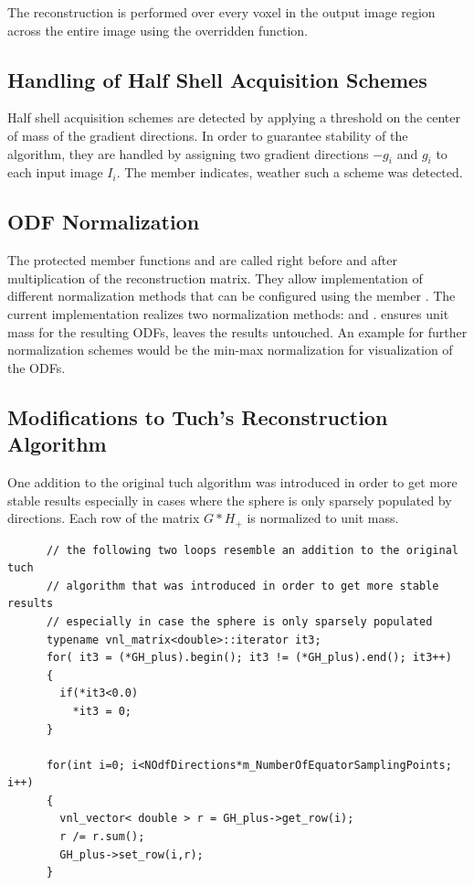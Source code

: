 \documentclass{InsightArticle}
\begin{document}
The reconstruction is performed over every voxel in the output image region across the entire image using the overridden  function.

\subsection{Handling of Half Shell Acquisition Schemes}
Half shell acquisition schemes are detected by applying a threshold on the center of mass of the gradient directions. In order to guarantee stability of the algorithm, they are handled by assigning two gradient directions $-g_i$ and $g_i$ to each input image $I_i$. The member  indicates, weather such a scheme was detected.

\subsection{ODF Normalization}
The protected member functions  and  are called right before and after multiplication of the reconstruction matrix. They allow implementation of different normalization methods that can be configured using the member . The current implementation realizes two normalization methods:  and .  ensures unit mass for the resulting ODFs,  leaves the results untouched. An example for further normalization schemes would be the min-max normalization for visualization of the ODFs.

\subsection{Modifications to Tuch's Reconstruction Algorithm}
One addition to the original tuch algorithm was introduced in order to get more stable results especially in cases where the sphere is only sparsely populated by directions. Each row of the matrix $G*H_+$ is normalized to unit mass. 
      
\small
\begin{verbatim}
      // the following two loops resemble an addition to the original tuch 
      // algorithm that was introduced in order to get more stable results 
      // especially in case the sphere is only sparsely populated
      typename vnl_matrix<double>::iterator it3;
      for( it3 = (*GH_plus).begin(); it3 != (*GH_plus).end(); it3++)
      {
        if(*it3<0.0)
          *it3 = 0;
      }

      for(int i=0; i<NOdfDirections*m_NumberOfEquatorSamplingPoints; i++)
      {
        vnl_vector< double > r = GH_plus->get_row(i);
        r /= r.sum();
        GH_plus->set_row(i,r);
      }
      \end{verbatim}
\normalsize
     
\end{document}
